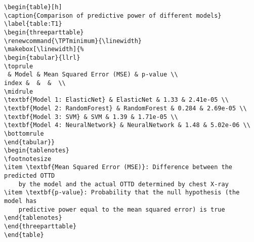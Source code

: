 \documentclass[11pt]{article}
\begin{document}
\begin{Verbatim}[tabsize=4]
\begin{table}[h]
\caption{Comparison of predictive power of different models}
\label{table:T1}
\begin{threeparttable}
\renewcommand{\TPTminimum}{\linewidth}
\makebox[\linewidth]{%
\begin{tabular}{llrl}
\toprule
 & Model & Mean Squared Error (MSE) & p-value \\
index &  &  &  \\
\midrule
\textbf{Model 1: ElasticNet} & ElasticNet & 1.33 & 2.41e-05 \\
\textbf{Model 2: RandomForest} & RandomForest & 0.284 & 2.69e-05 \\
\textbf{Model 3: SVM} & SVM & 1.39 & 1.71e-05 \\
\textbf{Model 4: NeuralNetwork} & NeuralNetwork & 1.48 & 5.02e-06 \\
\bottomrule
\end{tabular}}
\begin{tablenotes}
\footnotesize
\item \textbf{Mean Squared Error (MSE)}: Difference between the predicted OTTD
	by the model and the actual OTTD determined by chest X-ray
\item \textbf{p-value}: Probability that the null hypothesis (the model has
	predictive power equal to the mean squared error) is true
\end{tablenotes}
\end{threeparttable}
\end{table}

\end{Verbatim}




\end{document}

